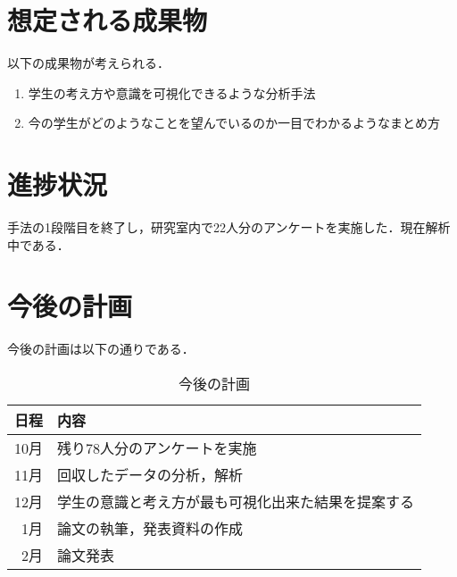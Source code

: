 \documentclass[uplatex,twocolumn,dvipdfmx]{jsarticle}
\begin{document}
\section{想定される成果物}
以下の成果物が考えられる．
\begin{enumerate}
\item 学生の考え方や意識を可視化できるような分析手法
\item 今の学生がどのようなことを望んでいるのか一目でわかるようなまとめ方
\end{enumerate}

\section{進捗状況}
手法の1段階目を終了し，研究室内で22人分のアンケートを実施した．現在解析中である．
\section{今後の計画}

今後の計画は以下の通りである．
\begin{table}[hbtp]
  \caption{今後の計画}
  \label{table:data_type}
  \centering
  \begin{tabular}{|r|l|}
    \hline
    日程 & 内容  \\ \hline \hline
    10月 & 残り78人分のアンケートを実施 \\
    11月 & 回収したデータの分析，解析 \\
    12月 & 学生の意識と考え方が最も可視化出来た結果を提案する \\
    1月 & 論文の執筆，発表資料の作成 \\
2月 & 論文発表\\
 \hline
  \end{tabular}
\end{table}



\end{document}
